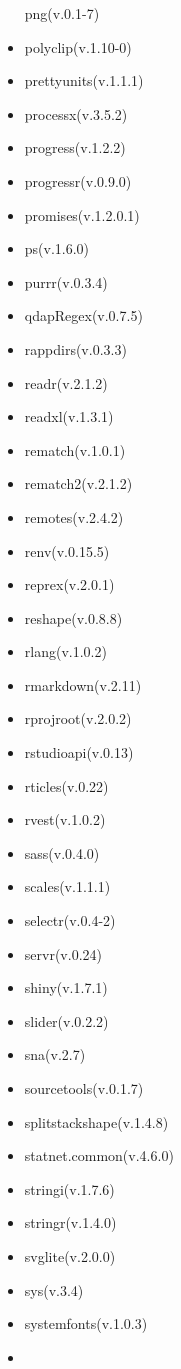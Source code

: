 \documentclass[
]{article}
\begin{document}
\begin{itemize}
  png(v.0.1-7)
\item
  polyclip(v.1.10-0)
\item
  prettyunits(v.1.1.1)
\item
  processx(v.3.5.2)
\item
  progress(v.1.2.2)
\item
  progressr(v.0.9.0)
\item
  promises(v.1.2.0.1)
\item
  ps(v.1.6.0)
\item
  purrr(v.0.3.4)
\item
  qdapRegex(v.0.7.5)
\item
  rappdirs(v.0.3.3)
\item
  readr(v.2.1.2)
\item
  readxl(v.1.3.1)
\item
  rematch(v.1.0.1)
\item
  rematch2(v.2.1.2)
\item
  remotes(v.2.4.2)
\item
  renv(v.0.15.5)
\item
  reprex(v.2.0.1)
\item
  reshape(v.0.8.8)
\item
  rlang(v.1.0.2)
\item
  rmarkdown(v.2.11)
\item
  rprojroot(v.2.0.2)
\item
  rstudioapi(v.0.13)
\item
  rticles(v.0.22)
\item
  rvest(v.1.0.2)
\item
  sass(v.0.4.0)
\item
  scales(v.1.1.1)
\item
  selectr(v.0.4-2)
\item
  servr(v.0.24)
\item
  shiny(v.1.7.1)
\item
  slider(v.0.2.2)
\item
  sna(v.2.7)
\item
  sourcetools(v.0.1.7)
\item
  splitstackshape(v.1.4.8)
\item
  statnet.common(v.4.6.0)
\item
  stringi(v.1.7.6)
\item
  stringr(v.1.4.0)
\item
  svglite(v.2.0.0)
\item
  sys(v.3.4)
\item
  systemfonts(v.1.0.3)
\item

\end{itemize}
\end{document}
